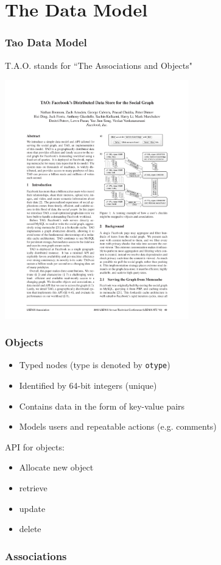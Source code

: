 \section{The Data Model}

\begin{frame}
\frametitle{Tao Data Model}
 	T.A.O. stands for ``The Associations and Objects"
 	\begin{center}
 	\includegraphics[width=0.6\textwidth]{figs/social2}		
 	\end{center}
\end{frame}

\begin{frame}[fragile]
\frametitle{Objects}
\begin{itemize}
	\item Typed nodes (type is denoted by \verb|otype|)
	\item Identified by 64-bit integers (unique) 
	\item Contains data in the form of key-value pairs
	\item Models users and repeatable actions (e.g. comments)
\end{itemize}
API for objects:
\begin{itemize}
	\item Allocate new object 
	\item retrieve
	\item update
	\item delete
\end{itemize}
 


\end{frame}


\begin{frame}
\frametitle{Associations}
    


\end{frame}